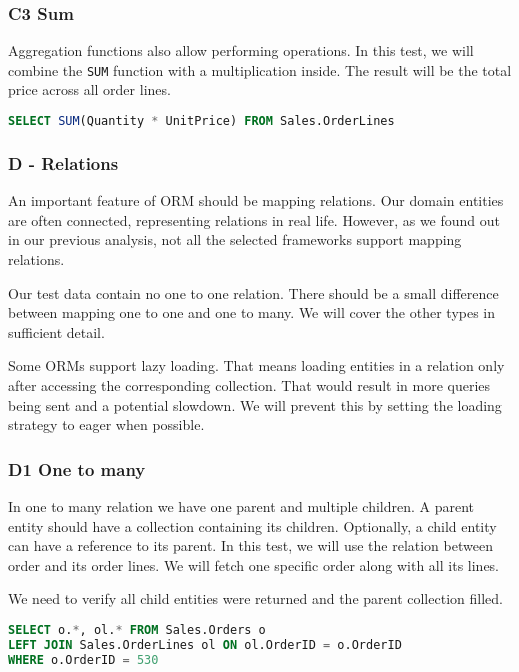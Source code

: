 \subsubsection*{C3 Sum} \label{query:c3}
Aggregation functions also allow performing operations. In this test, we will combine the \texttt{SUM} function with a multiplication inside. The result will be the total price across all order lines.
\begin{lstlisting}[language=SQL]
SELECT SUM(Quantity * UnitPrice) FROM Sales.OrderLines
\end{lstlisting}

\subsubsection{D - Relations}
An important feature of ORM should be mapping relations. Our domain entities are often connected, representing relations in real life.
However, as we found out in our previous analysis, not all the selected frameworks support mapping relations. 

Our test data contain no one to one relation. There should be a small difference between mapping one to one and one to many. We will cover the other types in sufficient detail.

Some ORMs support lazy loading. That means loading entities in a relation only after accessing the corresponding collection. That would result in more queries being sent and a potential slowdown.
We will prevent this by setting the loading strategy to eager when possible.

\subsubsection*{D1 One to many} \label{query:d1}
In one to many relation we have one parent and multiple children. A parent entity should have a collection containing its children. Optionally, a child entity can have a reference to its parent.
In this test, we will use the relation between order and its order lines. We will fetch one specific order along with all its lines.

We need to verify all child entities were returned and the parent collection filled. 



\begin{lstlisting}[language=SQL]
SELECT o.*, ol.* FROM Sales.Orders o
LEFT JOIN Sales.OrderLines ol ON ol.OrderID = o.OrderID
WHERE o.OrderID = 530
\end{lstlisting}

